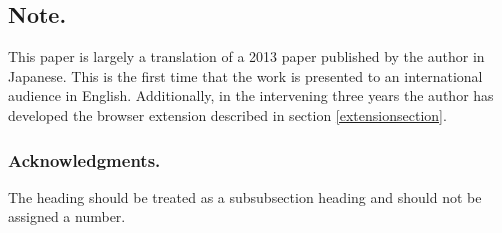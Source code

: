 \documentclass[runningheads,a4paper]{llncs}
\begin{document}
%
%

\subsection*{Note.}

This paper is largely a translation of a 2013 paper published by the
author in Japanese\cite{WISS2013}. This is the first time that the
work is presented to an international audience in English.
Additionally, in the intervening three years the author has
developed the browser extension described in section \ref{extensionsection}.



\subsubsection*{Acknowledgments.} The heading should be treated as a
subsubsection heading and should not be assigned a number.



\end{document}
